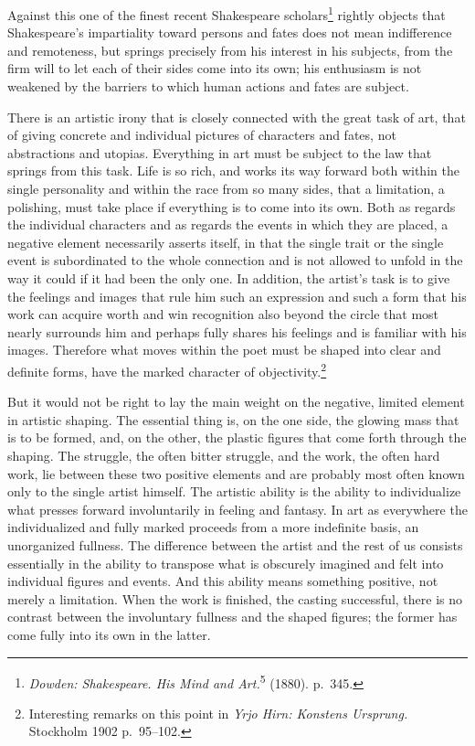 \documentclass[12pt]{book}
\newcommand{\opage}[1]{\marginnote{\footnotesize\textit{[#1]}}}
\begin{document}
Against this one of the finest recent Shakespeare scholars\footnote{\textit{Dowden:
Shakespeare. His Mind and Art.}\textsuperscript{5} (1880). p.~345.} rightly objects
that Shakespeare's impartiality toward persons and fates does not mean indifference
and remoteness, but springs precisely from his interest in his subjects, from the
firm will to let each of their sides come into its own; his enthusiasm is not
weakened by the barriers to which human actions and fates are subject.

There is an artistic irony that is closely connected with the great task of art,
that of giving concrete and individual pictures of characters and fates, not
abstractions and utopias. Everything in art must be subject to the law that springs
from this task. Life is so rich, and works its way forward both within the single
personality and within the race from so many sides, that a limitation, a polishing,
must take place if everything is to come into its own. Both as regards the individual
characters and as regards the events in which they are placed, a negative element
necessarily asserts itself, in that the single trait or the single event is
subordinated to the whole connection and is not allowed to unfold in the way it could
if it had been the only one. \opage{68}In addition, the artist's task is to give the
feelings and images that rule him such an expression and such a form that his work
can acquire worth and win recognition also beyond the circle that most nearly
surrounds him and perhaps fully shares his feelings and is familiar with his images.
Therefore what moves within the poet must be shaped into clear and definite forms,
have the marked character of objectivity.\footnote{Interesting remarks on this point
in \textit{Yrjo Hirn: Konstens Ursprung.} Stockholm 1902 p.~95--102.}

But it would not be right to lay the main weight on the negative, limited element in
artistic shaping. The essential thing is, on the one side, the glowing mass that is
to be formed, and, on the other, the plastic figures that come forth through the
shaping. The struggle, the often bitter struggle, and the work, the often hard work,
lie between these two positive elements and are probably most often known only to the
single artist himself. The artistic ability is the ability to individualize what
presses forward involuntarily in feeling and fantasy. In art as everywhere the
individualized and fully marked proceeds from a more indefinite basis, an unorganized
fullness. The difference between the artist and the rest of us consists essentially
in the ability to transpose what is obscurely imagined and felt into individual
figures and events. And this ability means something positive, not merely a
limitation. When the work is finished, the casting successful, there is no contrast
between the involuntary fullness and the shaped figures; the former has come fully
into its own in the latter.
\end{document}
